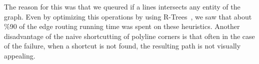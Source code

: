 \documentclass{gd-llncs}
\newcommand{\comm}[1]{}
\begin{document}
\label{fig:shortcut}

The reason for this was that we queured if a lines intersects any entity of the graph. Even by optimizing this operations by using R-Trees~\cite{guttman1984r}, we saw that about \%90 of the edge routing running time was spent on these heuristics. Another disadvantage of the naive shortcutting of polyline corners is that often in the case of the failure, when a shortcut is not found, the resulting path is not visually appealing.


\comm{
  \section{Further Examples}
}


\end{document}
